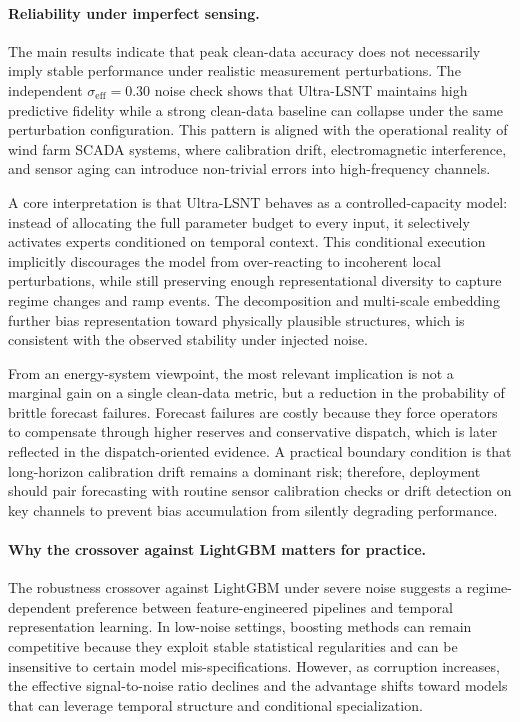 \documentclass[review,3p,times]{elsarticle}
\begin{document}
\paragraph{Reliability under imperfect sensing.}\label{subsec:disc_reliability}
The main results indicate that peak clean-data accuracy does not necessarily imply stable performance under realistic measurement perturbations. The independent $\sigma_{\mathrm{eff}}=0.30$ noise check shows that Ultra-LSNT maintains high predictive fidelity while a strong clean-data baseline can collapse under the same perturbation configuration. This pattern is aligned with the operational reality of wind farm SCADA systems, where calibration drift, electromagnetic interference, and sensor aging can introduce non-trivial errors into high-frequency channels.

A core interpretation is that Ultra-LSNT behaves as a controlled-capacity model: instead of allocating the full parameter budget to every input, it selectively activates experts conditioned on temporal context. This conditional execution implicitly discourages the model from over-reacting to incoherent local perturbations, while still preserving enough representational diversity to capture regime changes and ramp events. The decomposition and multi-scale embedding further bias representation toward physically plausible structures, which is consistent with the observed stability under injected noise.

From an energy-system viewpoint, the most relevant implication is not a marginal gain on a single clean-data metric, but a reduction in the probability of brittle forecast failures. Forecast failures are costly because they force operators to compensate through higher reserves and conservative dispatch, which is later reflected in the dispatch-oriented evidence. A practical boundary condition is that long-horizon calibration drift remains a dominant risk; therefore, deployment should pair forecasting with routine sensor calibration checks or drift detection on key channels to prevent bias accumulation from silently degrading performance.


\paragraph{Why the crossover against LightGBM matters for practice.}\label{subsec:disc_crossover}
The robustness crossover against LightGBM under severe noise suggests a regime-dependent preference between feature-engineered pipelines and temporal representation learning. In low-noise settings, boosting methods can remain competitive because they exploit stable statistical regularities and can be insensitive to certain model mis-specifications. However, as corruption increases, the effective signal-to-noise ratio declines and the advantage shifts toward models that can leverage temporal structure and conditional specialization.
\end{document}

